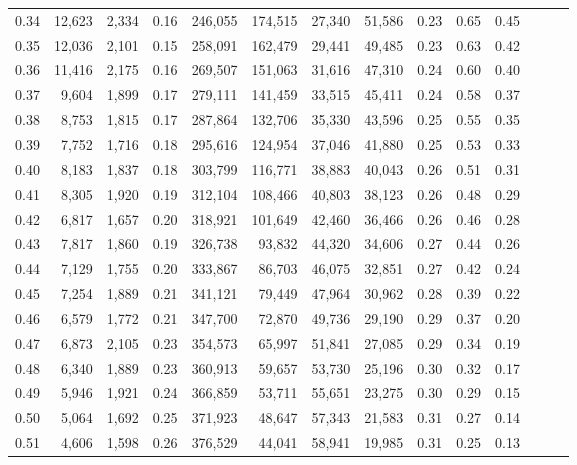 \begin{tabular}{rrrrrrrrrrrrrr}
0.34 &  12,623 &  2,334 &  0.16 &  246,055 &  174,515 &  27,340 &  51,586 &  0.23 &  0.65 &      0.45 \\
0.35 &  12,036 &  2,101 &  0.15 &  258,091 &  162,479 &  29,441 &  49,485 &  0.23 &  0.63 &      0.42 \\
0.36 &  11,416 &  2,175 &  0.16 &  269,507 &  151,063 &  31,616 &  47,310 &  0.24 &  0.60 &      0.40 \\
0.37 &   9,604 &  1,899 &  0.17 &  279,111 &  141,459 &  33,515 &  45,411 &  0.24 &  0.58 &      0.37 \\
0.38 &   8,753 &  1,815 &  0.17 &  287,864 &  132,706 &  35,330 &  43,596 &  0.25 &  0.55 &      0.35 \\
0.39 &   7,752 &  1,716 &  0.18 &  295,616 &  124,954 &  37,046 &  41,880 &  0.25 &  0.53 &      0.33 \\
0.40 &   8,183 &  1,837 &  0.18 &  303,799 &  116,771 &  38,883 &  40,043 &  0.26 &  0.51 &      0.31 \\
0.41 &   8,305 &  1,920 &  0.19 &  312,104 &  108,466 &  40,803 &  38,123 &  0.26 &  0.48 &      0.29 \\
0.42 &   6,817 &  1,657 &  0.20 &  318,921 &  101,649 &  42,460 &  36,466 &  0.26 &  0.46 &      0.28 \\
0.43 &   7,817 &  1,860 &  0.19 &  326,738 &   93,832 &  44,320 &  34,606 &  0.27 &  0.44 &      0.26 \\
0.44 &   7,129 &  1,755 &  0.20 &  333,867 &   86,703 &  46,075 &  32,851 &  0.27 &  0.42 &      0.24 \\
0.45 &   7,254 &  1,889 &  0.21 &  341,121 &   79,449 &  47,964 &  30,962 &  0.28 &  0.39 &      0.22 \\
0.46 &   6,579 &  1,772 &  0.21 &  347,700 &   72,870 &  49,736 &  29,190 &  0.29 &  0.37 &      0.20 \\
0.47 &   6,873 &  2,105 &  0.23 &  354,573 &   65,997 &  51,841 &  27,085 &  0.29 &  0.34 &      0.19 \\
0.48 &   6,340 &  1,889 &  0.23 &  360,913 &   59,657 &  53,730 &  25,196 &  0.30 &  0.32 &      0.17 \\
0.49 &   5,946 &  1,921 &  0.24 &  366,859 &   53,711 &  55,651 &  23,275 &  0.30 &  0.29 &      0.15 \\
0.50 &   5,064 &  1,692 &  0.25 &  371,923 &   48,647 &  57,343 &  21,583 &  0.31 &  0.27 &      0.14 \\
0.51 &   4,606 &  1,598 &  0.26 &  376,529 &   44,041 &  58,941 &  19,985 &  0.31 &  0.25 &      0.13 \\

\end{tabular}
